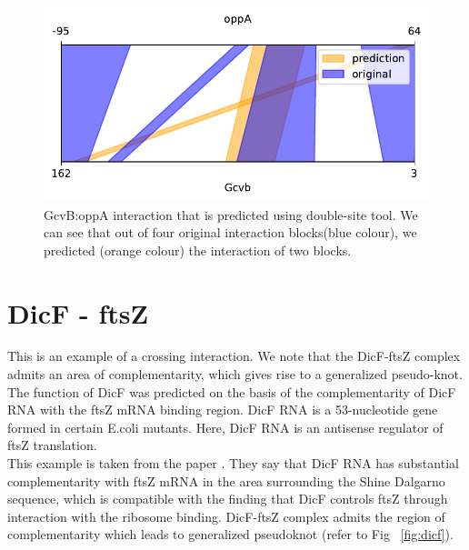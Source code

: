 \documentclass[twoside,a4paper]{report}
\numberwithin{equation}{section}
\begin{document}
	\begin{figure}[h!tb]
	\includegraphics[width=.5\linewidth]{rricomparison6}
	\centering
	\caption{ GcvB:oppA interaction that is predicted using double-site tool. We can see that out of four original interaction blocks(blue colour), we predicted (orange colour) the interaction of two blocks. } 
	\label{fig:rricomparison6}
\end{figure}


\clearpage
	
%	
	
	\section{DicF - ftsZ }
	
	This is an example of a crossing interaction. We note that the DicF-ftsZ complex admits an area of complementarity, which gives rise to a generalized pseudo-knot. \\   
	
	The function of DicF was predicted on the basis of the complementarity of DicF RNA with the ftsZ mRNA binding region. DicF RNA is a 53-nucleotide gene formed in certain E.coli mutants. Here, DicF RNA is an antisense regulator of ftsZ translation.\\
	
	This example is taken from the paper \citep{pervouchine2004iris}. They say that DicF RNA has substantial complementarity with ftsZ mRNA in the area surrounding the Shine Dalgarno sequence, which is compatible with the finding that DicF controls ftsZ through interaction with the ribosome binding. DicF-ftsZ complex admits the region of complementarity which leads to generalized pseudoknot (refer to Fig ~\ref{fig:dicf}). \\
	
\end{document}
